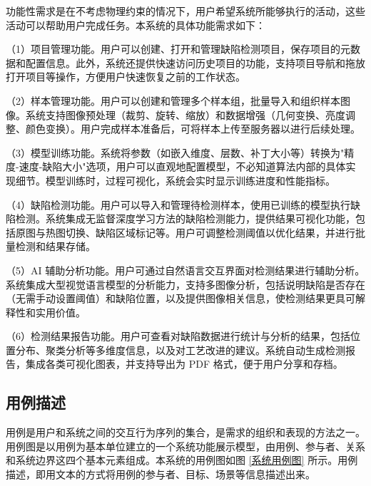 \documentclass[
  ]{njuthesis}
\begin{document}
功能性需求是在不考虑物理约束的情况下，⽤户希望系统所能够执⾏的活动，这些活动可以帮助⽤户完成任务。本系统的具体功能需求如下：

（1）项目管理功能。用户可以创建、打开和管理缺陷检测项目，保存项目的元数据和配置信息。此外，系统还提供快速访问历史项目的功能，支持项目导航和拖放打开项目等操作，方便用户快速恢复之前的工作状态。

（2）样本管理功能。用户可以创建和管理多个样本组，批量导入和组织样本图像。系统支持图像预处理（裁剪、旋转、缩放）和数据增强（几何变换、亮度调整、颜色变换）。用户完成样本准备后，可将样本上传至服务器以进行后续处理。

（3）模型训练功能。系统将参数（如嵌入维度、层数、补丁大小等）转换为"精度-速度-缺陷大小"选项，用户可以直观地配置模型，不必知道算法内部的具体实现细节。模型训练时，过程可视化，系统会实时显示训练进度和性能指标。

（4）缺陷检测功能。用户可以导入和管理待检测样本，使用已训练的模型执行缺陷检测。系统集成无监督深度学习方法的缺陷检测能力，提供结果可视化功能，包括原图与热图切换、缺陷区域标记等。用户可调整检测阈值以优化结果，并进行批量检测和结果存储。

（5）AI 辅助分析功能。用户可通过自然语言交互界面对检测结果进行辅助分析。系统集成大型视觉语言模型的分析能力，支持多图像分析，包括说明缺陷是否存在（无需手动设置阈值）和缺陷位置，以及提供图像相关信息，使检测结果更具可解释性和实用价值。

（6）检测结果报告功能。用户可查看对缺陷数据进行统计与分析的结果，包括位置分布、聚类分析等多维度信息，以及对工艺改进的建议。系统自动生成检测报告，集成各类可视化图表，并支持导出为 PDF 格式，便于用户分享和存档。

\subsection{用例描述}

用例是用户和系统之间的交互行为序列的集合，是需求的组织和表现的方法之一。用例图是以用例为基本单位建立的一个系统功能展示模型，由用例、参与者、关系和系统边界这四个基本元素组成。本系统的用例图如图 \ref{系统用例图} 所示。用例描述，即用文本的方式将用例的参与者、目标、场景等信息描述出来。
\end{document}
